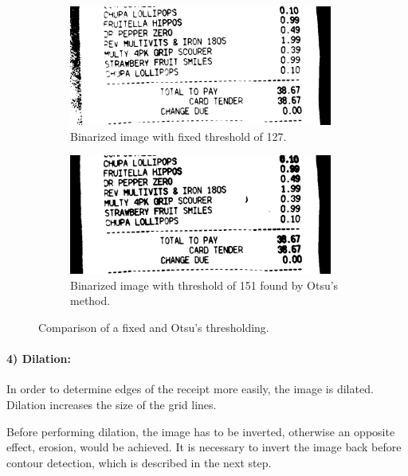 \documentclass[
  digital, %
  table,   %
  oneside, %
  lof,     %
  lot,     %
]{fithesis3}
\begin{document}
\begin{figure}
    \centering
    \begin{subfigure}[t]{0.5\textwidth}
      \centering
      \includegraphics[width=0.95\textwidth]{figures/image_processing/binary_threshold}
      \caption{Binarized image with fixed threshold of 127.}
      \label{fig:binary_threshold}
    \end{subfigure}
    \begin{subfigure}[t]{0.5\textwidth}
      \centering
      \includegraphics[width=0.95\textwidth]{figures/image_processing/otsu_threshold}
      \caption{Binarized image with threshold of 151 found by Otsu's method.}
      \label{fig:otsu_threshold}
    \end{subfigure}
    \caption{Comparison of a fixed and Otsu's thresholding.}
    \label{fig:threshold_comparison}
\end{figure}

\paragraph{4) Dilation:} In order to determine edges of the receipt more easily, the image is dilated. Dilation increases the size of the grid lines.

Before performing dilation, the image has to be inverted, otherwise an opposite effect, erosion, would be achieved. It is necessary to invert the image back before contour detection, which is described in the next step. 
\end{document}
